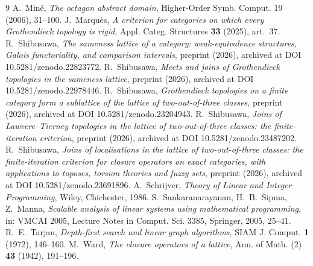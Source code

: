 \documentclass[11pt]{amsart}
\theoremstyle{definition}
\begin{document}
\begin{thebibliography}{9}
 A.~Min\'e, \emph{The octagon abstract domain}, Higher-Order
Symb. Comput. 19 (2006), 31--100.
 J.~Marqu\`es, \emph{A criterion for categories on
which every Grothendieck topology is rigid}, Appl. Categ. Structures
\textbf{33} (2025), art.\ 37.
 R.~Shibusawa, \emph{The sameness lattice of a category:
weak-equivalence structures, Galois functoriality, and comparison intervals},
preprint (2026), archived at DOI 10.5281/zenodo.22823772.
 R.~Shibusawa, \emph{Meets and joins of Grothendieck
topologies in the sameness lattice}, preprint (2026), archived at DOI
10.5281/zenodo.22978446.
 R.~Shibusawa, \emph{Grothendieck topologies on a finite
category form a sublattice of the lattice of two-out-of-three classes},
preprint (2026), archived at DOI 10.5281/zenodo.23204943.
 R.~Shibusawa, \emph{Joins of Lawvere--Tierney topologies
in the lattice of two-out-of-three classes: the finite-iteration criterion},
preprint (2026), archived at DOI 10.5281/zenodo.23487202.
 R.~Shibusawa, \emph{Joins of localisations in the lattice of
two-out-of-three classes: the finite-iteration criterion for closure
operators on exact categories, with applications to toposes, torsion
theories and fuzzy sets}, preprint (2026), archived at DOI
10.5281/zenodo.23691896.
 A.~Schrijver, \emph{Theory of Linear and Integer
Programming}, Wiley, Chichester, 1986.
 S.~Sankaranarayanan, H.~B.~Sipma, Z.~Manna, \emph{Scalable
analysis of linear systems using mathematical programming}, in: VMCAI
2005, Lecture Notes in Comput. Sci. 3385, Springer, 2005, 25--41.
 R.~E.~Tarjan, \emph{Depth-first search and linear graph
algorithms}, SIAM J. Comput. \textbf{1} (1972), 146--160.
 M.~Ward, \emph{The closure operators of a lattice}, Ann. of
Math. (2) \textbf{43} (1942), 191--196.
\end{thebibliography}
\end{document}
